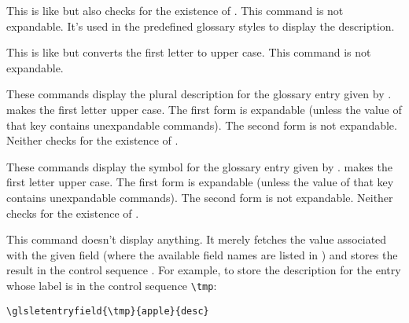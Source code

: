 \documentclass[report,inlinetitle]{nlctdoc}
\begin{document}
\begin{definition}[\DescribeMacro{\glossentrydesc}]
\end{definition}
This is like 
but also checks for the existence of . This command is
not expandable. It's used in the predefined glossary styles to
display the description.
\begin{definition}[\DescribeMacro{\Glossentrydesc}]
\end{definition}
This is like  but converts the first letter to
upper case. This command is not expandable.

\begin{definition}[\DescribeMacro{\glsentrydescplural}]
\end{definition}
\begin{definition}[\DescribeMacro{\Glsentrydescplural}]
\end{definition}
These commands display the plural description for the glossary entry
given by .  makes the first
letter upper case.
The first form is expandable (unless the value of that key contains unexpandable
commands). The second form is not expandable. Neither checks for the
existence of .


\begin{definition}[\DescribeMacro{\glsentrysymbol}]
\end{definition}
\begin{definition}[\DescribeMacro{\Glsentrysymbol}]
\end{definition}
These commands display the symbol for the glossary entry given by
.  makes the first letter upper case.
The first form is expandable (unless the value of that key contains unexpandable
commands). The second form is not expandable. Neither checks for the
existence of .


\begin{definition}[\DescribeMacro\glsletentryfield]
\end{definition}
This command doesn't display anything. It merely fetches the
value associated with the given field (where the available field names 
are listed in ) and stores the result
in the control sequence . For example, to store
the description for the entry whose label is  in the
control sequence \verb|\tmp|:
\begin{verbatim}
\glsletentryfield{\tmp}{apple}{desc}
\end{verbatim}
\end{document}
